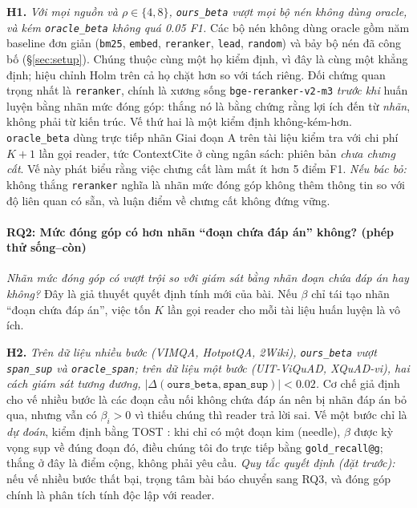\documentclass[11pt]{article}
\newcommand{\arm}[1]{\texttt{#1}}
\begin{document}
\textbf{H1.} \emph{Với mọi nguồn và $\rho\in\{4,8\}$, \arm{ours\_beta} vượt mọi bộ nén không dùng
oracle, và kém \arm{oracle\_beta} không quá 0.05 F1.}
Các bộ nén không dùng oracle gồm năm baseline đơn giản (\arm{bm25}, \arm{embed}, \arm{reranker},
\arm{lead}, \arm{random}) và bảy bộ nén đã công bố (\S\ref{sec:setup}). Chúng thuộc cùng một họ kiểm
định, vì đây là cùng một khẳng định; hiệu chỉnh Holm trên cả họ chặt hơn so với tách riêng. Đối chứng
quan trọng nhất là \arm{reranker}, chính là xương sống \texttt{bge-reranker-v2-m3} \emph{trước khi}
huấn luyện bằng nhãn mức đóng góp: thắng nó là bằng chứng rằng lợi ích đến từ \emph{nhãn}, không phải
từ kiến trúc. Vế thứ hai là một kiểm định không-kém-hơn. \arm{oracle\_beta} dùng trực tiếp nhãn Giai
đoạn A trên tài liệu kiểm tra với chi phí $K{+}1$ lần gọi reader, tức ContextCite ở cùng ngân sách:
phiên bản \emph{chưa chưng cất}. Vế này phát biểu rằng việc chưng cất làm mất ít hơn 5 điểm F1.
\emph{Nếu bác bỏ:} không thắng \arm{reranker} nghĩa là nhãn mức đóng góp không thêm thông tin so với
độ liên quan có sẵn, và luận điểm về chưng cất không đứng vững.

\paragraph{RQ2: Mức đóng góp có hơn nhãn ``đoạn chứa đáp án'' không? (phép thử sống--còn)}
\emph{Nhãn mức đóng góp có vượt trội so với giám sát bằng nhãn đoạn chứa đáp án hay không?} Đây là
giả thuyết quyết định tính mới của bài. Nếu $\beta$ chỉ tái tạo nhãn ``đoạn chứa đáp án'', việc tốn
$K$ lần gọi reader cho mỗi tài liệu huấn luyện là vô ích.

\textbf{H2.} \emph{Trên dữ liệu nhiều bước (VIMQA, HotpotQA, 2Wiki), \arm{ours\_beta} vượt
\arm{span\_sup} và \arm{oracle\_span}; trên dữ liệu một bước (UIT-ViQuAD, XQuAD-vi), hai cách giám
sát tương đương, $|\Delta(\arm{ours\_beta},\arm{span\_sup})|<0.02$.}
Cơ chế giả định cho vế nhiều bước là các đoạn cầu nối không chứa đáp án nên bị nhãn đáp án bỏ qua,
nhưng vẫn có $\beta_i>0$ vì thiếu chúng thì reader trả lời sai. Vế một bước chỉ là \emph{dự đoán},
kiểm định bằng TOST \citep{schuirmann1987tost}: khi chỉ có một đoạn kim (needle), $\beta$ được kỳ vọng
sụp về đúng đoạn đó, điều chúng tôi đo trực tiếp bằng \texttt{gold\_recall@g}; thắng ở đây là điểm
cộng, không phải yêu cầu. \emph{Quy tắc quyết định (đặt trước):} nếu vế nhiều bước thất bại, trọng tâm
bài báo chuyển sang RQ3, và đóng góp chính là phân tích tính độc lập với reader.
\end{document}
